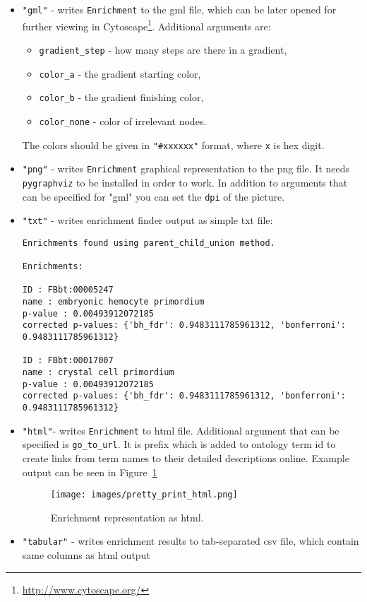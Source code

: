 \begin{itemize}
\item \verb|"gml"| - writes \verb|Enrichment| to the gml file, which can be later opened
for further viewing in Cytoscape\footnote{\url{http://www.cytoscape.org/}}.
Additional arguments are:
\begin{itemize}
\item \verb|gradient_step| - how many steps are there in a gradient,
\item \verb|color_a| - the gradient starting color,
\item \verb|color_b| - the gradient finishing color,
\item \verb|color_none| - color of irrelevant nodes.
\end{itemize}
The colors should be given in \verb|"#xxxxxx"| format, where \verb|x| is hex digit.
\item \verb|"png"| - writes \verb|Enrichment| graphical representation to the png file.
It needs \verb|pygraphviz| to be installed in order to work. In addition to arguments that
can be specified for "gml" you can set the \verb|dpi| of the picture.
\item \verb|"txt"| - writes enrichment finder output as simple txt file:
\begin{verbatim}
Enrichments found using parent_child_union method.

Enrichments:

ID : FBbt:00005247
name : embryonic hemocyte primordium
p-value : 0.00493912072185
corrected p-values: {'bh_fdr': 0.9483111785961312, 'bonferroni': 0.9483111785961312}

ID : FBbt:00017007
name : crystal cell primordium
p-value : 0.00493912072185
corrected p-values: {'bh_fdr': 0.9483111785961312, 'bonferroni': 0.9483111785961312}
\end{verbatim}

\item \verb|"html"|- writes \verb|Enrichment| to html file. Additional argument that
can be specified is \verb|go_to_url|. It is prefix which is added to ontology
term id to create links from term names to their detailed descriptions online.
Example output can be seen in Figure~\ref{fig:prettyhtml}


\begin{htmlonly}
\label{fig:prettyhtml}
\end{htmlonly}

\begin{latexonly}
\begin{figure}[htbp]
\centering
\texttt{[image: images/pretty\_print\_html.png]}
\caption{Enrichment representation as html.}
\label{fig:prettyhtml}
\end{figure}
\end{latexonly}

\item \verb|"tabular"| - writes enrichment results to tab-separated csv file, which
contain same columns as html output
\end{itemize}



